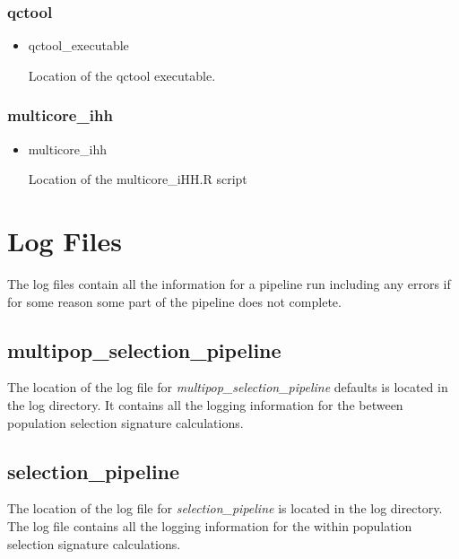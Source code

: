 \documentclass[a4paper,10pt]{article}
\begin{document}
                             \subsubsection{qctool}
                             \begin{itemize}
                             \item qctool\_executable

                             Location of the qctool executable.
                             \end{itemize}
                             \subsubsection{multicore\_ihh}
                             \begin{itemize}
                             \item multicore\_ihh

                             Location of the multicore\_iHH.R script



                             \end{itemize}
                             \section{Log Files}
                             The log files contain all the information for a pipeline run including any errors if for some reason some part of the pipeline does not complete.
                             \subsection{multipop\_selection\_pipeline}
                             The location of the log file for  \emph{multipop\_selection\_pipeline} defaults is
                             located in the log directory. It contains all the logging information
                             for the between population selection signature calculations.

                                 \subsection{selection\_pipeline}
                                 The location of the log file for \emph{selection\_pipeline} is located
                                 in the log directory. The log file contains all the logging
                                 information for the within population selection signature
                                 calculations.
\end{document}
